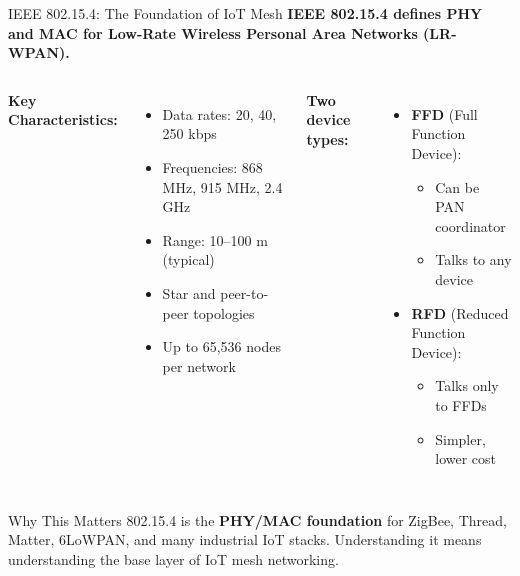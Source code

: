 \documentclass[aspectratio=169,11pt]{beamer}
\begin{document}
\begin{frame}{IEEE 802.15.4: The Foundation of IoT Mesh}
    \textbf{IEEE 802.15.4 defines PHY and MAC for Low-Rate Wireless Personal Area Networks (LR-WPAN).}
    
    \vspace{0.3cm}
    \begin{columns}
        \textbf{Key Characteristics:}
        \begin{itemize}
            \item Data rates: 20, 40, 250 kbps
            \item Frequencies: 868 MHz, 915 MHz, 2.4 GHz
            \item Range: 10--100 m (typical)
            \item Star and peer-to-peer topologies
            \item Up to 65,536 nodes per network
        \end{itemize}
        
        \textbf{Two device types:}
        \begin{itemize}
            \item \textbf{FFD} (Full Function Device):
            \begin{itemize}
                \item Can be PAN coordinator
                \item Talks to any device
            \end{itemize}
            \item \textbf{RFD} (Reduced Function Device):
            \begin{itemize}
                \item Talks only to FFDs
                \item Simpler, lower cost
            \end{itemize}
        \end{itemize}
    \end{columns}
    
    \vspace{0.3cm}
    \begin{exampleblock}{Why This Matters}
        802.15.4 is the \textbf{PHY/MAC foundation} for ZigBee, Thread, Matter, 6LoWPAN, and many industrial IoT stacks. Understanding it means understanding the base layer of IoT mesh networking.
    \end{exampleblock}
\end{frame}
\end{document}

